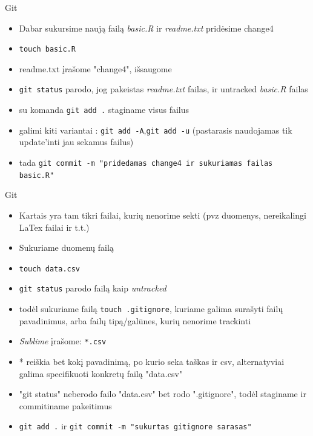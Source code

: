 \documentclass[11pt,xcolor=table]{beamer}
\begin{document}

\begin{frame}[fragile]{Git}
\begin{itemize}
\item Dabar sukursime naują failą \textit{basic.R} ir \textit{readme.txt} pridėsime change4
\item \colorbox{listinggray}{\lstinline|touch basic.R|}
\item readme.txt įrašome "change4", išsaugome
\item \colorbox{listinggray}{\lstinline|git status|} parodo, jog pakeistas \textit{readme.txt} failas, ir untracked \textit{basic.R} failas
\item su komanda \colorbox{listinggray}{\lstinline|git add .|} staginame visus failus
\item galimi kiti variantai : \colorbox{listinggray}{\lstinline|git add -A|},\colorbox{listinggray}{\lstinline|git add -u|} (pastarasis naudojamas tik update'inti jau sekamus failus)
\item tada \colorbox{listinggray}{\lstinline|git commit -m "pridedamas change4 ir sukuriamas failas basic.R"|}
\end{itemize}
\end{frame}

\begin{frame}[fragile]{Git}
\begin{itemize}
\item Kartais yra tam tikri failai, kurių nenorime sekti (pvz duomenys, nereikalingi LaTex failai ir t.t.)
\item Sukuriame duomenų failą
\item \colorbox{listinggray}{\lstinline|touch data.csv|} 
\item \colorbox{listinggray}{\lstinline|git status|} parodo failą kaip \textit{untracked}
\item todėl sukuriame failą \colorbox{listinggray}{\lstinline|touch .gitignore|}, kuriame galima surašyti failų pavadinimus, arba failų tipą/galūnes, kurių nenorime trackinti
\item \textit{Sublime} įrašome:  \colorbox{listinggray}{\lstinline|*.csv|} 
\item * reiškia bet kokį pavadinimą, po kurio seka taškas ir csv, alternatyviai galima specifikuoti konkretų failą "data.csv"
\item "git status" neberodo failo "data.csv" bet rodo ".gitignore", todėl staginame ir commitiname pakeitimus
\item \colorbox{listinggray}{\lstinline|git add .|} ir  \colorbox{listinggray}{\lstinline|git commit -m "sukurtas gitignore sarasas"|}  
\end{itemize}
\end{frame}
\end{document}

